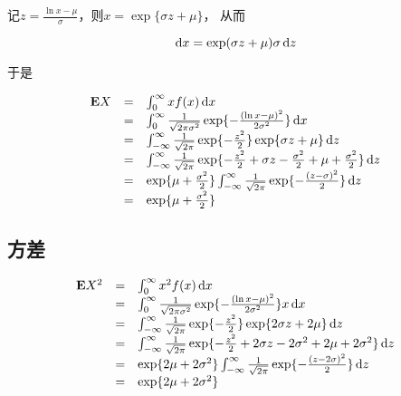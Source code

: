 记$z = \frac{\ln x - \mu}{\sigma}$，则$x = \exp\{\sigma z + \mu\}$， 从而

\begin{equation}
    \,\mathrm{d} x = \exp(\sigma z + \mu)\sigma \,\mathrm{d} z
\end{equation}

于是

\begin{equation}\label{eq_lognorm_e1}
    \begin{array}{rcl}
        \mathbf{E} X & = & \int_0^\infty xf(x)\,\mathrm{d} x                                                                                                        \\
             & = & \int_0^\infty \frac{1}{\sqrt{2\pi\sigma^2}}\exp\{-\frac{(\ln x - \mu)^2}{2\sigma^2}\}\,\mathrm{d} x                                      \\
             & = & \int_{-\infty}^\infty\frac{1}{\sqrt{2\pi}}\exp\{-\frac{z^2}{2}\} \exp\{\sigma z + \mu\} \,\mathrm{d} z                                     \\
             & = & \int_{-\infty}^\infty\frac{1}{\sqrt{2\pi}}\exp\{-\frac{z^2}{2}+ \sigma z -\frac{\sigma^2}{2} + \mu + \frac{\sigma^2}{2}\} \,\mathrm{d} z \\
             & = & \exp\{\mu + \frac{\sigma^2}{2}\}\int_{-\infty}^\infty\frac{1}{\sqrt{2\pi}}\exp\{ -\frac{(z-\sigma)^2}{2}\} \,\mathrm{d} z                  \\
             & = & \exp\{\mu + \frac{\sigma^2}{2}\}
    \end{array}
\end{equation}

\subsection{方差}
\begin{equation}
    \begin{array}{rcl}
        \mathbf{E} X^2 & = & \int_0^\infty x^2f(x)\,\mathrm{d} x                                                                                                        \\
               & = & \int_0^\infty \frac{1}{\sqrt{2\pi\sigma^2}}\exp\{-\frac{(\ln x - \mu)^2}{2\sigma^2}\}x\,\mathrm{d} x                                      \\
               & = & \int_{-\infty}^\infty\frac{1}{\sqrt{2\pi}}\exp\{-\frac{z^2}{2}\} \exp\{2\sigma z + 2\mu\} \,\mathrm{d} z                                     \\
               & = & \int_{-\infty}^\infty\frac{1}{\sqrt{2\pi}}\exp\{-\frac{z^2}{2}+ 2\sigma z -2\sigma^2 + 2\mu + 2\sigma^2\} \,\mathrm{d} z \\
               & = & \exp\{2\mu + 2\sigma^2\}\int_{-\infty}^\infty\frac{1}{\sqrt{2\pi}}\exp\{ -\frac{(z-2\sigma)^2}{2}\} \,\mathrm{d} z                  \\
               & = & \exp\{2\mu + 2\sigma^2\}
    \end{array}
\end{equation}

